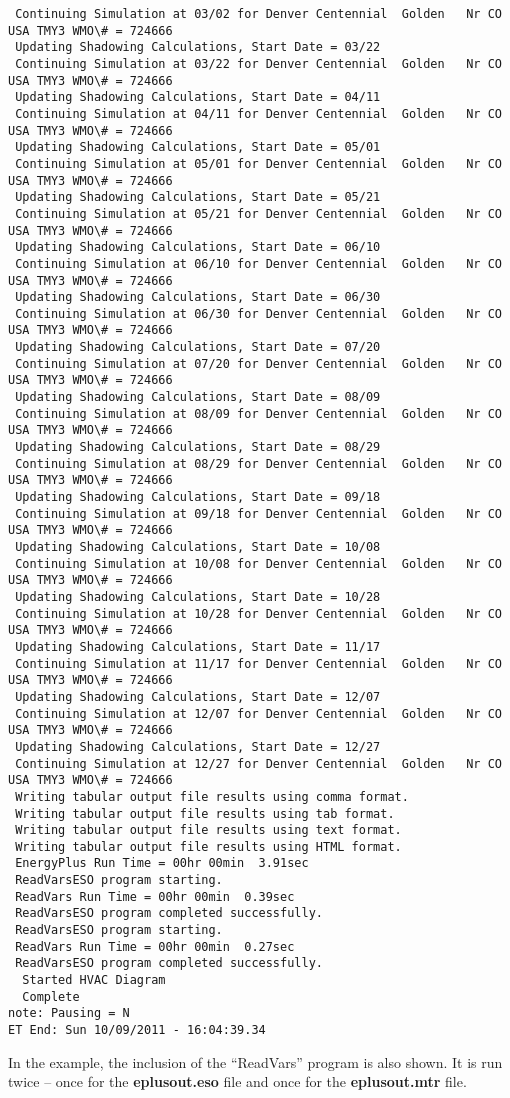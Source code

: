 \begin{lstlisting}
 Continuing Simulation at 03/02 for Denver Centennial  Golden   Nr CO USA TMY3 WMO\# = 724666
 Updating Shadowing Calculations, Start Date = 03/22
 Continuing Simulation at 03/22 for Denver Centennial  Golden   Nr CO USA TMY3 WMO\# = 724666
 Updating Shadowing Calculations, Start Date = 04/11
 Continuing Simulation at 04/11 for Denver Centennial  Golden   Nr CO USA TMY3 WMO\# = 724666
 Updating Shadowing Calculations, Start Date = 05/01
 Continuing Simulation at 05/01 for Denver Centennial  Golden   Nr CO USA TMY3 WMO\# = 724666
 Updating Shadowing Calculations, Start Date = 05/21
 Continuing Simulation at 05/21 for Denver Centennial  Golden   Nr CO USA TMY3 WMO\# = 724666
 Updating Shadowing Calculations, Start Date = 06/10
 Continuing Simulation at 06/10 for Denver Centennial  Golden   Nr CO USA TMY3 WMO\# = 724666
 Updating Shadowing Calculations, Start Date = 06/30
 Continuing Simulation at 06/30 for Denver Centennial  Golden   Nr CO USA TMY3 WMO\# = 724666
 Updating Shadowing Calculations, Start Date = 07/20
 Continuing Simulation at 07/20 for Denver Centennial  Golden   Nr CO USA TMY3 WMO\# = 724666
 Updating Shadowing Calculations, Start Date = 08/09
 Continuing Simulation at 08/09 for Denver Centennial  Golden   Nr CO USA TMY3 WMO\# = 724666
 Updating Shadowing Calculations, Start Date = 08/29
 Continuing Simulation at 08/29 for Denver Centennial  Golden   Nr CO USA TMY3 WMO\# = 724666
 Updating Shadowing Calculations, Start Date = 09/18
 Continuing Simulation at 09/18 for Denver Centennial  Golden   Nr CO USA TMY3 WMO\# = 724666
 Updating Shadowing Calculations, Start Date = 10/08
 Continuing Simulation at 10/08 for Denver Centennial  Golden   Nr CO USA TMY3 WMO\# = 724666
 Updating Shadowing Calculations, Start Date = 10/28
 Continuing Simulation at 10/28 for Denver Centennial  Golden   Nr CO USA TMY3 WMO\# = 724666
 Updating Shadowing Calculations, Start Date = 11/17
 Continuing Simulation at 11/17 for Denver Centennial  Golden   Nr CO USA TMY3 WMO\# = 724666
 Updating Shadowing Calculations, Start Date = 12/07
 Continuing Simulation at 12/07 for Denver Centennial  Golden   Nr CO USA TMY3 WMO\# = 724666
 Updating Shadowing Calculations, Start Date = 12/27
 Continuing Simulation at 12/27 for Denver Centennial  Golden   Nr CO USA TMY3 WMO\# = 724666
 Writing tabular output file results using comma format.
 Writing tabular output file results using tab format.
 Writing tabular output file results using text format.
 Writing tabular output file results using HTML format.
 EnergyPlus Run Time = 00hr 00min  3.91sec
 ReadVarsESO program starting.
 ReadVars Run Time = 00hr 00min  0.39sec
 ReadVarsESO program completed successfully.
 ReadVarsESO program starting.
 ReadVars Run Time = 00hr 00min  0.27sec
 ReadVarsESO program completed successfully.
  Started HVAC Diagram
  Complete
note: Pausing = N
ET End: Sun 10/09/2011 - 16:04:39.34
\end{lstlisting}

In the example, the inclusion of the ``ReadVars'' program is also shown. It is run twice -- once for the \textbf{eplusout.eso} file and once for the \textbf{eplusout.mtr} file.
